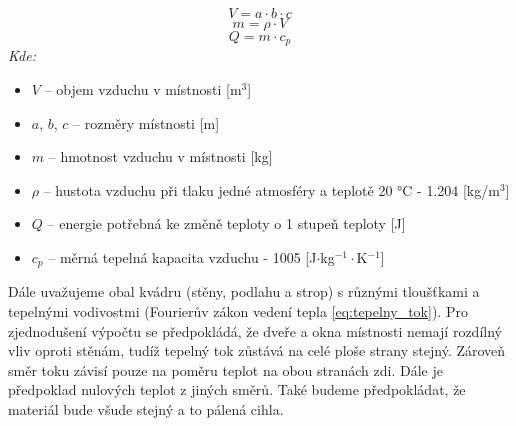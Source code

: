 \begin{equation}
    V = a \cdot b \cdot c
    \label{eq:objem}
\end{equation}
\begin{equation}
    m = \rho \cdot V
    \label{eq:hmotnost}
\end{equation}
\begin{equation}
    Q = m \cdot c_p
    \label{eq:energie}
\end{equation}
\noindent\textit{Kde:}
\begin{itemize}
    \item $V$ -- objem vzduchu v místnosti [m$^3$]
    \item $a$, $b$, $c$ -- rozměry místnosti [m]
    \item $m$ -- hmotnost vzduchu v místnosti [kg]
    \item $\rho$ -- hustota vzduchu při tlaku jedné atmosféry a teplotě 20 °C - 1.204 [kg/m$^3$]
    \item $Q$ -- energie potřebná ke změně teploty o 1 stupeň teploty [J]
    \item $c_p$ -- měrná tepelná kapacita vzduchu - 1005 [J$\cdot$kg$^{-1}\cdot$K$^{-1}$] \newline
\end{itemize}
\noindent Dále uvažujeme obal kvádru (stěny, podlahu a strop) s různými tloušťkami a tepelnými vodivostmi (Fourierův zákon vedení tepla \ref{eq:tepelny_tok}). Pro zjednodušení výpočtu se předpokládá, že dveře a okna místnosti nemají rozdílný vliv oproti stěnám, tudíž tepelný tok zůstává na celé ploše strany stejný. Zároveň směr toku závisí pouze na poměru teplot na obou stranách zdi. Dále je předpoklad nulových teplot z jiných směrů. Také budeme předpokládat, že materiál bude všude stejný a to pálená cihla. 

